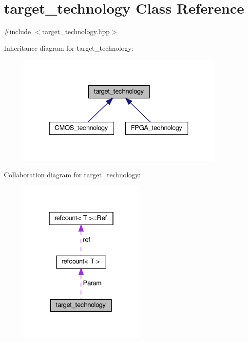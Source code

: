 \hypertarget{classtarget__technology}{}\section{target\+\_\+technology Class Reference}
\label{classtarget__technology}


{\ttfamily \#include $<$target\+\_\+technology.\+hpp$>$}



Inheritance diagram for target\+\_\+technology\+:
\nopagebreak
\begin{figure}[H]
\begin{center}
\leavevmode
\includegraphics[width=294pt]{dd/d43/classtarget__technology__inherit__graph}
\end{center}
\end{figure}


Collaboration diagram for target\+\_\+technology\+:
\nopagebreak
\begin{figure}[H]
\begin{center}
\leavevmode
\includegraphics[width=178pt]{db/db1/classtarget__technology__coll__graph}
\end{center}
\end{figure}
